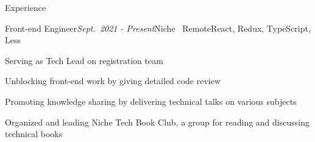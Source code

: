 \documentclass{resume} %
\begin{document}

\begin{rSection}{Experience}
\begin{rSubsection}{Front-end Engineer}{\em Sept.\ 2021 - Present}{Niche \textbar \ Remote}{React, Redux, TypeScript, Less}




\item Serving as Tech Lead on registration team
\item Unblocking front-end work by giving detailed code review
\item Promoting knowledge sharing by delivering technical talks on various subjects
\item Organized and leading Niche Tech Book Club, a group for reading and discussing technical books
\end{rSubsection}


\end{rSection}
\end{document}
